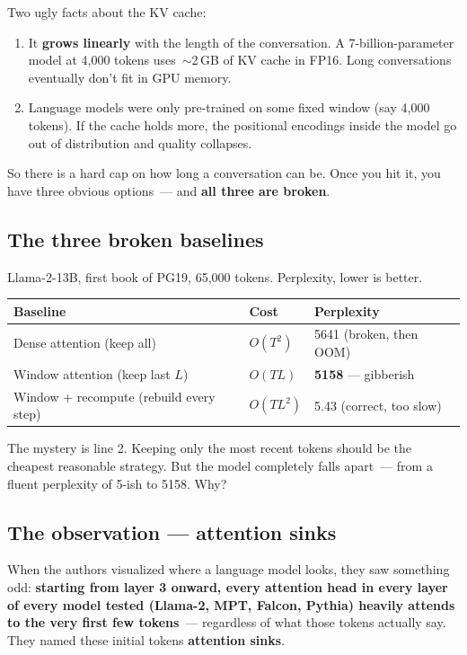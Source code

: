 \documentclass[11pt,a4paper]{article}
\begin{document}
Two ugly facts about the KV cache:
\begin{enumerate}[leftmargin=1.5em,itemsep=0.1em]
  \item It \textbf{grows linearly} with the length of the conversation. A
        7-billion-parameter model at 4{,}000 tokens uses~$\sim$2\,GB of KV
        cache in FP16. Long conversations eventually don't fit in GPU
        memory.
  \item Language models were only pre-trained on some fixed window (say
        4{,}000 tokens). If the cache holds more, the positional
        encodings inside the model go out of distribution and quality
        collapses.
\end{enumerate}

So there is a hard cap on how long a conversation can be. Once you hit it,
you have three obvious options~--- and \textbf{all three are broken}.

\subsection{The three broken baselines}
Llama-2-13B, first book of PG19, 65{,}000 tokens. Perplexity, lower is
better.

\begin{center}
\begin{tabular}{lll}
\toprule
\textbf{Baseline} & \textbf{Cost} & \textbf{Perplexity} \\
\midrule
Dense attention (keep all)               & $O(T^2)$   & 5641 (broken, then OOM) \\
Window attention (keep last $L$)         & $O(TL)$    & \textbf{5158} --- gibberish \\
Window + recompute (rebuild every step)  & $O(TL^2)$  & 5.43 (correct, too slow) \\
\bottomrule
\end{tabular}
\end{center}

The mystery is line 2. Keeping only the most recent tokens should be the
cheapest reasonable strategy. But the model completely falls apart~---
from a fluent perplexity of 5-ish to 5158. Why?

\subsection{The observation --- attention sinks}
When the authors visualized where a language model looks, they saw
something odd: \textbf{starting from layer 3 onward, every attention head
in every layer of every model tested (Llama-2, MPT, Falcon, Pythia)
heavily attends to the very first few tokens}~--- regardless of what
those tokens actually say. They named these initial tokens
\textbf{attention sinks}.
\end{document}
